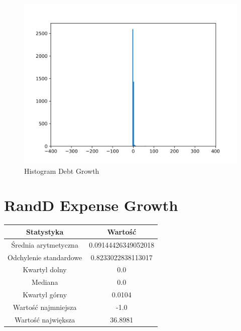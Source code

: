 \documentclass{article}
\begin{document}
\begin{figure}[h!]
    \includegraphics[width=\linewidth]{variables/Debt Growth.png}
    \caption{Histogram Debt Growth }
\end{figure}\section{ RandD Expense Growth }

\begin{center}
    \begin{tabular}{|c | c|} 
    \hline
    Statystyka & Wartość \\
    \hline\hline
    Średnia arytmetyczna & 0.09144426349052018 \\ 
    \hline
    Odchylenie standardowe & 0.8233022838113017 \\
    \hline
    Kwartyl dolny & 0.0 \\
    \hline
    Mediana & 0.0 \\
    \hline
    Kwartyl górny & 0.0104 \\
    \hline
    Wartość najmniejsza & -1.0 \\
    \hline
    Wartość największa & 36.8981 \\
    \hline
   \end{tabular}
\end{center}
\end{document}
